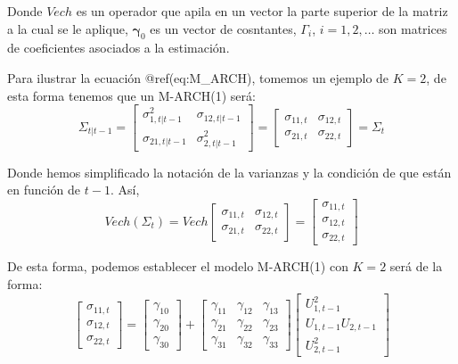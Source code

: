 \documentclass[
]{book}
\begin{document}
Donde \(Vech\) es un operador que apila en un vector la parte superior de la matriz a la cual se le aplique, \(\boldsymbol{\gamma}_0\) es un vector de cosntantes, \(\Gamma_i\), \(i = 1, 2, \ldots\) son matrices de coeficientes asociados a la estimación.

Para ilustrar la ecuación @ref(eq:M\_ARCH), tomemos un ejemplo de \(K = 2\), de esta forma tenemos que un M-ARCH(1) será:
\begin{equation*}
    \Sigma_{t | t-1} = 
    \begin{bmatrix}
    \sigma^2_{1, t | t-1} & \sigma_{12, t | t-1} \\ \sigma_{21, t | t-1} & \sigma^2_{2, t | t-1}
    \end{bmatrix} = 
    \begin{bmatrix}
    \sigma_{11, t} & \sigma_{12, t} \\ \sigma_{21, t} & \sigma_{22, t}
    \end{bmatrix} =
    \Sigma_{t}
\end{equation*}

Donde hemos simplificado la notación de la varianzas y la condición de que están en función de \(t-1\). Así,
\begin{equation*}
    Vech(\Sigma_{t}) = 
    Vech \begin{bmatrix}
    \sigma_{11, t} & \sigma_{12, t} \\ \sigma_{21, t} & \sigma_{22, t}
    \end{bmatrix} =
    \begin{bmatrix}
    \sigma_{11, t} \\ \sigma_{12, t} \\ \sigma_{22, t}
    \end{bmatrix}
\end{equation*}

De esta forma, podemos establecer el modelo M-ARCH(1) con \(K = 2\) será de la forma:
\begin{equation*}
    \begin{bmatrix}
    \sigma_{11, t} \\ \sigma_{12, t} \\ \sigma_{22, t}
    \end{bmatrix} =
    \begin{bmatrix}
    \gamma_{10} \\ \gamma_{20} \\ \gamma_{30}
    \end{bmatrix} +
    \begin{bmatrix}
    \gamma_{11} & \gamma_{12} & \gamma_{13} \\ \gamma_{21} & \gamma_{22} & \gamma_{23} \\ \gamma_{31} & \gamma_{32} & \gamma_{33}
    \end{bmatrix} 
    \begin{bmatrix}
    U^2_{1, t-1} \\ U_{1, t-1} U_{2, t-1} \\ U^2_{2, t-1}
    \end{bmatrix}
\end{equation*}
\end{document}

